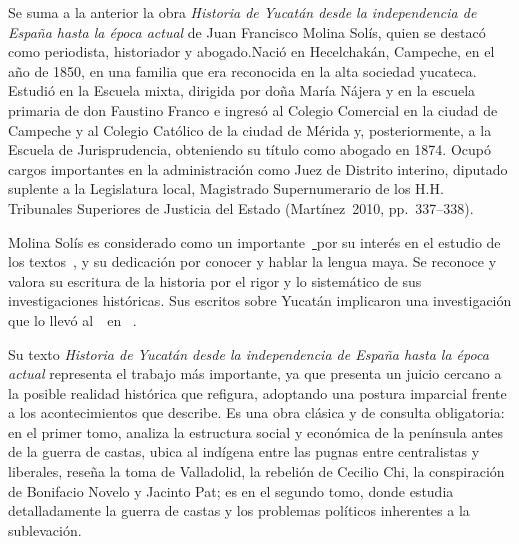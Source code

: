 
Se suma a la anterior la obra \textit{Historia de Yucatán desde la
independencia de España hasta la época actual} de  Juan Francisco Molina
Solís, quien se destacó como periodista, historiador y abogado.Nació en 
Hecelchakán, Campeche, en el año de 1850, en una familia que era
reconocida en la alta sociedad yucateca. Estudió en la Escuela mixta,
dirigida por doña María Nájera y en la escuela primaria de don Faustino
Franco e ingresó al Colegio Comercial en la ciudad de Campeche y al Colegio
Católico  de la ciudad de Mérida y, posteriormente, a la Escuela de
Jurisprudencia, obteniendo su título como abogado en 1874. Ocupó cargos
importantes en la administración como Juez de Distrito interino, diputado
suplente a la Legislatura local, Magistrado Supernumerario de los H.H.
Tribunales Superiores de Justicia del Estado (Martínez~2010, pp.~337--338). 

\enlargethispage{1\baselineskip}
Molina Solís es considerado como un
importante~\href{http://es.wikipedia.org/wiki/Mayista}{\textstyleInternetLink{\textcolor[rgb]{0.0,0.0,0.039215688}{mayis}}}\href{http://es.wikipedia.org/wiki/Mayista}{%
}\href{http://es.wikipedia.org/wiki/Mayista}{\textstyleInternetLink{\textcolor[rgb]{0.0,0.0,0.039215688}{ta}}} 
por su interés en el estudio de los
textos~\href{http://es.wikipedia.org/wiki/Lengua_maya}{}{,
y su dedicación por conocer y hablar la lengua maya.} Se 
reconoce y valora su escritura de la historia por el rigor y lo sistemático
de sus investigaciones históricas. Sus escritos sobre Yucatán implicaron
una investigación que lo llevó
al~\href{http://es.wikipedia.org/wiki/Archivo_de_Indias}{}~{en}~\href{http://es.wikipedia.org/wiki/España}{}  {.}


Su texto \textit{Historia de Yucatán desde la independencia de España hasta
la época actual} representa el trabajo más importante, ya que presenta un
juicio cercano a la posible realidad histórica que refigura, adoptando una
postura imparcial frente a los acontecimientos que describe. Es una obra
clásica y de consulta obligatoria: en el primer tomo, analiza  la
estructura social y económica de la península antes de la guerra  de
castas, ubica al indígena entre las pugnas entre centralistas y liberales,
reseña la toma de Valladolid, la rebelión de Cecilio Chi, la conspiración
de Bonifacio Novelo y Jacinto Pat;  es en el segundo tomo, donde  estudia
detalladamente la guerra de castas y los problemas políticos inherentes a
la sublevación.

